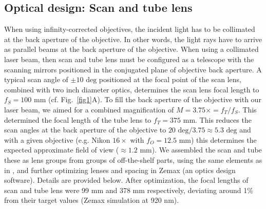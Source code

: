 \documentclass[10pt,letterpaper]{article}
\begin{document}
\subsection*{Optical design: Scan and tube lens}
When using infinity-corrected objectives, the incident light has to be collimated at the back aperture of the objective. In other words, the light rays have to arrive as parallel beams at the back aperture of the objective. When using a collimated laser beam, then scan and tube lens must be configured as a telescope with the scanning mirrors positioned in the conjugated plane of objective back aperture. A typical scan angle of $\pm10\text{ deg}$ positioned at the focal point of the scan lens, combined with two inch diameter optics, determines the scan lens focal length to $f_S=100\text{ mm}$ (cf. Fig.~\ref{fig1}A). To fill the back aperture of the objective with our laser beam, we aimed for a combined magnification of $M=3.75\times=f_T/f_S$. This determined the focal length of the tube lens to $f_T=375\text{ mm}$. This reduces the scan angles at the back aperture of the objective to $20\text{ deg}/3.75\approx 5.3\text{ deg}$ and with a given objective (e.g. Nikon $16\times$ with $f_O=12.5\text{ mm}$) this determines the expected approximate field of view ($\approx 1.2\text{ mm}$).\newline
We assembled the scan and tube these as lens groups from groups of off-the-shelf parts, using the same elements as in \cite{Yao2023}, and further optimizing lenses and spacing in Zemax (an optics design software). Details are provided below. After optimization, the focal lengths of scan and tube lens were 99 mm and 378 mm respectively, deviating around 1\% from their target values (Zemax simulation at 920 nm).
%
\end{document}
